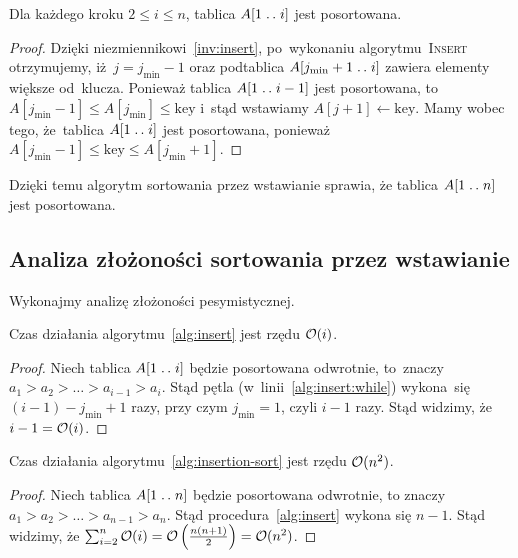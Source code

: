 \begin{invariant}
    Dla każdego kroku \( 2 \le i \le n \), tablica \( A[1 \mathrel{{.}\,{.}}\nobreak i] \)
    jest posortowana.
\end{invariant}
\begin{proof}
    Dzięki niezmiennikowi~\ref{inv:insert}, 
    po~wykonaniu algorytmu~\textsc{Insert} otrzymujemy,
    iż~\( j = j_{\text{min}} - 1 \) oraz podtablica 
    \( A[ j_{\text{min}} + 1 \mathrel{{.}\,{.}}\nobreak i] \)
    zawiera elementy większe od~klucza. Ponieważ
    tablica \( A[1 \mathrel{{.}\,{.}}\nobreak i - 1] \) jest posortowana,
    to~\( A[j_{\text{min}} - 1] 
    \le A[j_{\text{min}}] \le \text{key} \) i~stąd
    wstawiamy \( A[j + 1] \gets \text{key} \).
    Mamy wobec tego, że~tablica \( A[1 \mathrel{{.}\,{.}}\nobreak i] \) 
    jest posortowana, ponieważ \( A[j_{\text{min}} - 1] 
    \le \text{key} \le A[j_{\text{min}} + 1] \).
\end{proof}

Dzięki temu algorytm sortowania przez wstawianie 
sprawia, że tablica \( A[1 \mathrel{{.}\,{.}}\nobreak n] \) jest posortowana.

\subsection{Analiza złożoności sortowania przez wstawianie}
Wykonajmy analizę złożoności pesymistycznej.
\begin{fact}
    Czas działania algorytmu~\ref{alg:insert}
    jest rzędu \( \mathcal{O}(i) \).
\end{fact}
\begin{proof}
    Niech tablica \( A[1 \mathrel{{.}\,{.}}\nobreak i] \) będzie 
    posortowana odwrotnie, to~znaczy
    \( a_1 > a_2 > \dotso > a_{i - 1} > a_i \).
    Stąd pętla (w~linii~\ref{alg:insert:while})
    wykona~się \( (i - 1) - j_{\text{min}} + 1 \)
    razy, przy czym \( j_{\text{min}} = 1 \),
    czyli \( i - 1 \) razy. Stąd widzimy,
    że \( i - 1 = \mathcal{O}(i) \).
\end{proof}

\begin{fact}
    Czas działania algorytmu~\ref{alg:insertion-sort}
    jest rzędu \( \mathcal{O}(n^2) \).
\end{fact}
\begin{proof}
    Niech tablica \( A[1 \mathrel{{.}\,{.}}\nobreak n] \) będzie 
    posortowana odwrotnie, to znaczy
    \( a_1 > a_2 > \dotso > a_{n - 1} > a_n \).
    Stąd procedura~\ref{alg:insert}
    wykona się \( n - 1 \).
    Stąd widzimy,
    że \( \sum_{i = 2}^n \mathcal{O}(i)
     = \mathcal{O} \left( \frac{n(n + 1)}{2} \right)
     = \mathcal{O}(n^2) \).
\end{proof}

